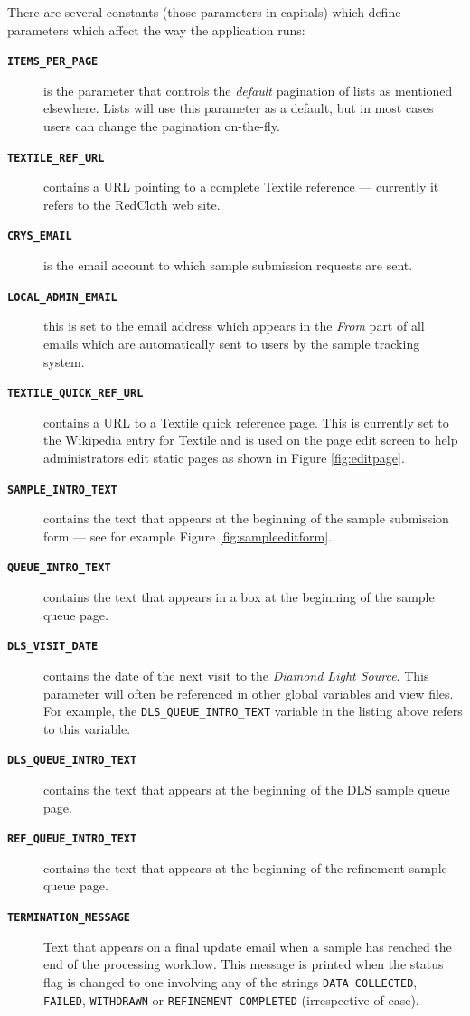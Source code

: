 \documentclass[12pt,twoside]{article}
\begin{document}
There are several constants (those parameters in capitals) which define
parameters which affect the way the application runs:
\begin{description}
\item[\texttt{\textbf{ITEMS\_PER\_PAGE}}]
is the parameter that controls the \emph{default} pagination of lists
as mentioned elsewhere. Lists will use this parameter as a default, but
in most cases users can change the pagination on-the-fly.
\item[\texttt{\textbf{TEXTILE\_REF\_URL}}]
contains a URL pointing to a complete Textile reference --- currently
it refers to the RedCloth web site.
\item[\texttt{\textbf{CRYS\_EMAIL}}]
is the email account to which sample submission requests are sent.
\item[\texttt{\textbf{LOCAL\_ADMIN\_EMAIL}}]
this is set to the email address which appears in the \emph{From}
part of all emails which are automatically sent to users by the sample
tracking system.
\item[\texttt{\textbf{TEXTILE\_QUICK\_REF\_URL}}]
contains a URL to a Textile quick reference page. This is currently set
to the Wikipedia entry for Textile and is used on the page edit screen
to help administrators edit static pages as shown in Figure \ref{fig:editpage}.
\item[\texttt{\textbf{SAMPLE\_INTRO\_TEXT}}]
contains the text that appears at the beginning of the sample
submission form --- see for example Figure \ref{fig:sampleeditform}. 
\item[\texttt{\textbf{QUEUE\_INTRO\_TEXT}}]
contains the text that appears in a box at the beginning of the sample
queue page.
\item[\texttt{\textbf{DLS\_VISIT\_DATE}}]
contains the date of the next visit to the \emph{Diamond Light Source}. This
parameter will often be referenced in other global variables and view files.
For example, the \verb=DLS_QUEUE_INTRO_TEXT= variable in the listing above
refers to this variable.
\item[\texttt{\textbf{DLS\_QUEUE\_INTRO\_TEXT}}]
contains the text that appears at the beginning of the DLS sample
queue page.
\item[\texttt{\textbf{REF\_QUEUE\_INTRO\_TEXT}}]
contains the text that appears at the beginning of the refinement sample
queue page.
\item[\texttt{\textbf{TERMINATION\_MESSAGE}}]
Text that appears on a final update email when a sample has reached the
end of the processing workflow. This message is printed when the status
flag is changed to one involving any of the strings
\verb=DATA COLLECTED=, \verb=FAILED=, \verb=WITHDRAWN= or
\verb=REFINEMENT COMPLETED= (irrespective of case).
\end{description}
\end{document}
